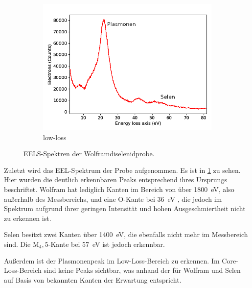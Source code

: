\begin{figure}[H]
\begin{subfigure}[b]{0.7\textwidth}
				\includegraphics[width= 1 \linewidth]{img/tem_mark}
				\caption{low-loss}
	\end{subfigure}
		\caption{
      EELS-Spektren der Wolframdiselenidprobe.
			}
    \label{fig:eels}
	\end{figure}

  Zuletzt wird das EEL-Spektrum der Probe aufgenommen.
  Es ist in \cref{fig:eels} zu sehen.
  Hier wurden die deutlich erkennbaren Peaks entsprechend ihres Ursprungs beschriftet.
  Wolfram hat lediglich Kanten im Bereich von über \SI{1800}{eV}, also außerhalb des Messbereichs, und eine O-Kante bei \SI{36}{eV} \cite{eelsinfo}, die jedoch im Spektrum aufgrund ihrer geringen Intensität und hohen Ausgeschmiertheit nicht zu erkennen ist.

  Selen besitzt zwei Kanten über \SI{1400}{eV}, die ebenfalls nicht mehr im Messbereich sind.
  Die M$_4,5$-Kante bei \SI{57}{eV} ist jedoch erkennbar.

  Außerdem ist der Plasmonenpeak im Low-Loss-Bereich zu erkennen.
  Im Core-Loss-Bereich sind keine Peaks sichtbar, was anhand der für Wolfram und Selen auf Basis von \cite{eelsinfo} bekannten Kanten der Erwartung entspricht.


